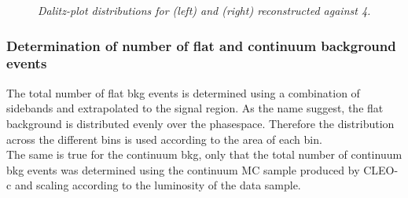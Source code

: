 \begin{figure}[!h]
\begin{center}
\end{center}
\caption{\textit{Dalitz-plot distributions for \KsPiPi (left) and \KlPiPi (right) reconstructed against 4\Pi.}}
\label{ps}
\end{figure}

\subsubsection{Determination of number of flat and continuum background events}
\label{sec:flat}
The total number of flat bkg events is determined using a combination of sidebands and extrapolated to the signal region. As the name suggest, the flat background is distributed evenly over the \KsPiPi phasespace. Therefore the distribution across the different \KsPiPi bins is used according to the area of each bin.\\
The same is true for the continuum bkg, only that the total number of continuum bkg events was determined using the continuum MC sample produced by CLEO-c and scaling according to the luminosity of the data sample.\\


